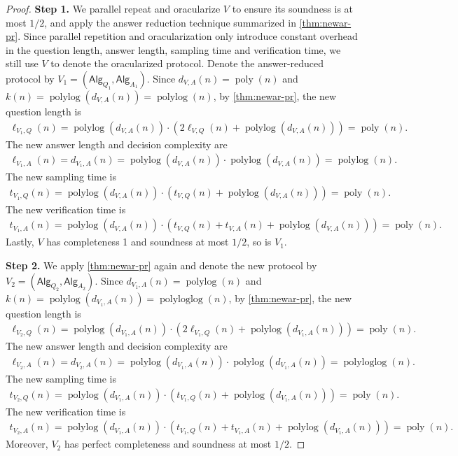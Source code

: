 \documentclass[10pt,a4paper]{article}
\theoremstyle{plain}
\theoremstyle{definition}
\newcommand{\poly} {\ensuremath{\operatorname{poly}}}
\newcommand{\polylog} {\ensuremath{\operatorname{polylog}}}
\newcommand{\polyloglog} {\ensuremath{\operatorname{polyloglog}}}
\newcommand{\1}{\mathbb{1}} %
\newcommand{\Alg}{\mathsf{Alg}}
\begin{document}
\begin{proof}
    \textbf{Step 1.} We parallel repeat and oracularize $V$ to ensure its soundness is at most $1/2$, and apply the answer reduction technique summarized in \cref{thm:newar-pr}.
    Since parallel repetition and oracularization only introduce constant overhead in the question length, answer length, sampling time and verification time, we still use $V$ to denote the oracularized protocol.
    Denote the answer-reduced protocol by $V_1 = (\Alg_{Q_1},\Alg_{A_1})$.
    Since $d_{V,A}(n) = \poly(n)$ and $k(n)= \polylog(d_{V,A}(n)) = \polylog(n)$,
    by \cref{thm:newar-pr}, the new question length is
     \begin{align*}
         \ell_{V_1,Q}(n) = \polylog(d_{V,A}(n)) \cdot (2 \ell_{V,Q}(n) + \polylog(d_{V,A}(n))) = \poly(n).
     \end{align*}
     The new answer length and decision complexity are 
     \begin{align*}
         \ell_{V_1,A}(n) = d_{V_1, A}(n) = \polylog(d_{V,A}(n)) \cdot \polylog(d_{V,A}(n)) = \polylog(n).
     \end{align*}
     The new sampling time is
     \begin{align*}
         t_{V_1,Q}(n) = \polylog(d_{V,A}(n)) \cdot (t_{V,Q}(n) + \polylog(d_{V,A}(n))) = \poly(n).
     \end{align*}
     The new verification time is 
     \begin{align*}
         t_{V_1,A}(n) = \polylog(d_{V,A}(n)) \cdot (t_{V,Q}(n) + t_{V,A}(n) + \polylog(d_{V,A}(n))) = \poly(n).
     \end{align*}
     Lastly, $V$ has completeness 1 and soundness at most $1/2$, so is $V_1$.
    
    \textbf{Step 2.} We apply \cref{thm:newar-pr} again and denote the new protocol by $V_2 = (\Alg_{Q_2}, \Alg_{A_2})$.
    Since $d_{V_1,A}(n) = \polylog(n)$ and $k(n)= \polylog(d_{V_1,A}(n)) = \polyloglog(n)$,
    by \cref{thm:newar-pr}, the new question length is
     \begin{align*}
         \ell_{V_2,Q}(n) = \polylog(d_{V_1,A}(n)) \cdot (2 \ell_{V_1,Q}(n) + \polylog(d_{V_1,A}(n))) = \poly(n).
     \end{align*}
     The new answer length and decision complexity are 
     \begin{align*}
         \ell_{V_2,A}(n) = d_{V_2, A}(n) = \polylog(d_{V_1,A}(n)) \cdot \polylog(d_{V_1,A}(n)) = \polyloglog(n).
     \end{align*}
     The new sampling time is
     \begin{align*}
         t_{V_2,Q}(n) = \polylog(d_{V_1,A}(n)) \cdot (t_{V_1,Q}(n) + \polylog(d_{V_1,A}(n))) = \poly(n).
     \end{align*}
     The new verification time is 
     \begin{align*}
         t_{V_2,A}(n) = \polylog(d_{V_1,A}(n)) \cdot (t_{V_1,Q}(n) + t_{V_1,A}(n) + \polylog(d_{V_1,A}(n))) = \poly(n).
     \end{align*}
    Moreover, $V_2$ has perfect completeness and soundness at most $1/2$.
    

\end{proof}
\end{document}
